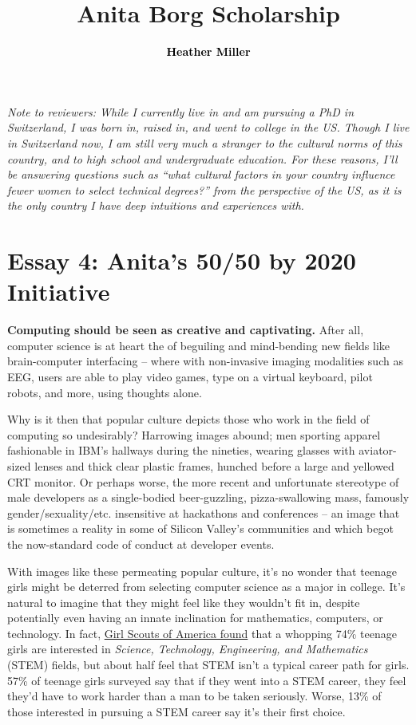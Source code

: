\documentclass[acmtocl]{acmtrans2m}
\title{{\color{Black}Anita Borg Scholarship}}
\author{\textcolor{Black}{\textbf{Heather Miller}}}
\begin{document}
\setmonofont[Mapping=tex-text,Scale=0.9]{Inconsolata}
%
\maketitle

{\em Note to reviewers: While I currently live in and am pursuing a PhD in
Switzerland, I was born in, raised in, and went to college in the US. Though I
live in Switzerland now, I am still very much a stranger to the cultural norms
of this country, and to high school and undergraduate education. For these
reasons, I'll be answering questions such as ``what cultural factors in your
country influence fewer women to select technical degrees?'' from the
perspective of the US, as it is the only country I have deep intuitions and
experiences with.}

\section*{\textbf{Essay 4:} Anita's 50/50 by 2020 Initiative}

\textbf{Computing should be seen as creative and captivating.}
After all, computer science is at heart the of beguiling and mind-bending new
fields like {brain-computer} interfacing -- where with non-invasive imaging
modalities such as EEG, users are able to play video games, type on a virtual
keyboard, pilot robots, and more, using thoughts alone.

Why is it then that popular culture depicts those who work in the field of
computing so undesirably? Harrowing images abound; men sporting apparel
fashionable in IBM's hallways during the nineties, wearing glasses with
aviator-sized lenses and thick clear plastic frames, hunched before a large
and yellowed CRT monitor. Or perhaps worse, the more recent and unfortunate
stereotype of male developers as a {single-bodied} {beer-guzzling},
{pizza-swallowing} mass, famously gender/sexuality/etc. insensitive at
hackathons and conferences -- an image that is sometimes a reality in
some of Silicon Valley's communities and which begot the {now-standard} code
of conduct at developer events.

With images like these permeating popular culture, it's no wonder that teenage
girls might be deterred from selecting computer science as a major in college.
It's natural to imagine that they might feel like they wouldn't fit in,
despite potentially even having an innate inclination for mathematics,
computers, or technology. In fact,
\href{https://www.girlscouts.org/research/pdf/generation\_stem\_full\_report.pdf}{Girl Scouts of America found}
\cite{Girlscouts} that a whopping 74\% teenage girls are interested in {\em
Science, Technology, Engineering, and Mathematics} (STEM) fields, but about
half feel that STEM isn't a typical career path for girls. 57\% of teenage
girls surveyed say that if they went into a STEM career, they feel they'd have
to work harder than a man to be taken seriously. Worse, 13\% of those
interested in pursuing a STEM career say it's their first choice.
\end{document}

